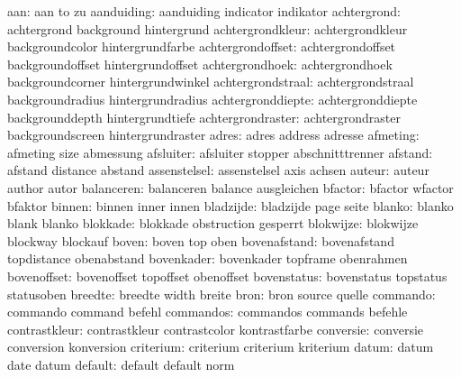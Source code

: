                 aan:  aan                  to                  zu
         aanduiding:  aanduiding           indicator           indikator
        achtergrond:  achtergrond          background          hintergrund
   achtergrondkleur:  achtergrondkleur     backgroundcolor     hintergrundfarbe
  achtergrondoffset:  achtergrondoffset    backgroundoffset    hintergrundoffset
    achtergrondhoek:  achtergrondhoek      backgroundcorner    hintergrundwinkel
  achtergrondstraal:  achtergrondstraal    backgroundradius    hintergrundradius
  achtergronddiepte:  achtergronddiepte    backgrounddepth     hintergrundtiefe
  achtergrondraster:  achtergrondraster    backgroundscreen    hintergrundraster
              adres:  adres                address             adresse
           afmeting:  afmeting             size                abmessung
          afsluiter:  afsluiter            stopper             abschnitttrenner
            afstand:  afstand              distance            abstand
       assenstelsel:  assenstelsel         axis                achsen
             auteur:  auteur               author              autor
         balanceren:  balanceren           balance             ausgleichen
            bfactor:  bfactor              wfactor             bfaktor
             binnen:  binnen               inner               innen
          bladzijde:  bladzijde            page                seite
             blanko:  blanko               blank               blanko
           blokkade:  blokkade             obstruction         gesperrt
          blokwijze:  blokwijze            blockway            blockauf
              boven:  boven                top                 oben
       bovenafstand:  bovenafstand         topdistance         obenabstand
         bovenkader:  bovenkader           topframe            obenrahmen
        bovenoffset:  bovenoffset          topoffset           obenoffset
        bovenstatus:  bovenstatus          topstatus           statusoben
            breedte:  breedte              width               breite
               bron:  bron                 source              quelle
           commando:  commando             command             befehl
          commandos:  commandos            commands            befehle
      contrastkleur:  contrastkleur        contrastcolor       kontrastfarbe
          conversie:  conversie            conversion          konversion
          criterium:  criterium            criterium           kriterium
              datum:  datum                date                datum
            default:  default              default             norm
